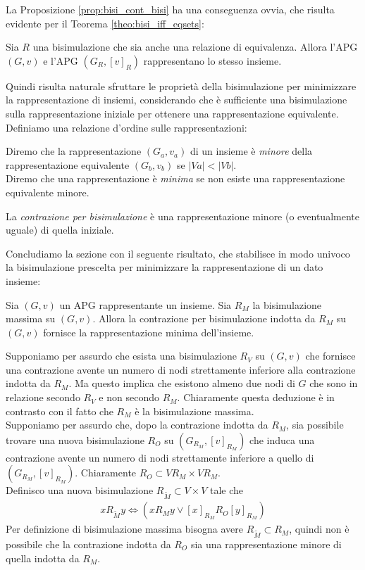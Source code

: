 La Proposizione \ref{prop:bisi_cont_bisi} ha una conseguenza ovvia, che risulta evidente per il Teorema \ref{theo:bisi_iff_eqsets}:
\begin{corollary}
    Sia $R$ una bisimulazione che sia anche una relazione di equivalenza. Allora l'APG $(G, v)$ e l'APG $(G_R, [v]_R)$ rappresentano lo stesso insieme.
\end{corollary}
Quindi risulta naturale sfruttare le proprietà della bisimulazione per minimizzare la rappresentazione di insiemi, considerando che è sufficiente una bisimulazione sulla rappresentazione iniziale per ottenere una rappresentazione equivalente. Definiamo una relazione d'ordine sulle rappresentazioni:
\begin{definition}
    Diremo che la rappresentazione $(G_a, v_a)$ di un insieme è \emph{minore} della rappresentazione equivalente $(G_b, v_b)$ se $|Va| < |Vb|$.\\
    Diremo che una rappresentazione è \emph{minima} se non esiste una rappresentazione equivalente minore.
\end{definition}
\begin{observation}
    La \emph{contrazione per bisimulazione} è una rappresentazione minore (o eventualmente uguale) di quella iniziale.
\end{observation}
Concludiamo la sezione con il seguente risultato, che stabilisce in modo univoco la bisimulazione prescelta per minimizzare la rappresentazione di un dato insieme:
\begin{theorem}
    Sia $(G,v)$ un APG rappresentante un insieme. Sia $R_M$ la bisimulazione massima su $(G,v)$. Allora la contrazione per bisimulazione indotta da $R_M$ su $(G,v)$ fornisce la rappresentazione minima dell'insieme.
\end{theorem}
\begin{proof2}
    Supponiamo per assurdo che esista una bisimulazione $R_V$ su $(G,v)$ che fornisce una contrazione avente un numero di nodi strettamente inferiore alla contrazione indotta da $R_M$. Ma questo implica che esistono almeno due nodi di $G$ che sono in relazione secondo $R_V$ e non secondo $R_M$. Chiaramente questa deduzione è in contrasto con il fatto che $R_M$ è la bisimulazione massima.\\
    Supponiamo per assurdo che, dopo la contrazione indotta da $R_M$, sia possibile trovare una nuova bisimulazione $R_O$ su $(G_{R_M}, [v]_{R_M})$ che induca una contrazione avente un numero di nodi strettamente inferiore a quello di $(G_{R_M}, [v]_{R_M})$. Chiaramente $R_O \subset V{R_M} \times V{R_M}$.\\
    Definisco una nuova bisimulazione $R_{\widetilde{M}} \subset V\times V$ tale che
    \begin{gather*}
        x R_{\widetilde{M}} y \iff (x R_M y \lor [x]_{R_M} R_O [y]_{R_M})
    \end{gather*}
    Per definizione di bisimulazione massima bisogna avere $R_{\widetilde{M}} \subset R_M$, quindi non è possibile che la contrazione indotta da $R_O$ sia una rappresentazione minore di quella indotta da $R_M$.
\end{proof2}

